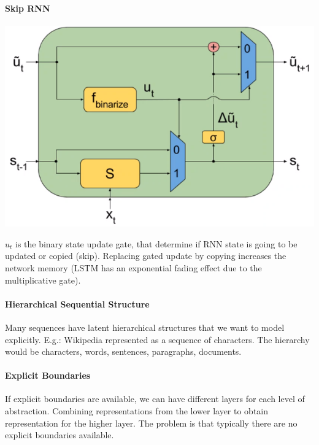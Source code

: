 \documentclass[10pt]{report}
\begin{document}
\paragraph{Skip RNN}
\begin{center}
	\includegraphics[scale=0.5]{125.png}
\end{center}
$u_t$ is the binary state update gate, that determine if RNN state is going to be updated or copied (skip). Replacing gated update by copying increases the network memory (LSTM has an exponential fading effect due to the multiplicative gate).
\paragraph{Hierarchical Sequential Structure}
Many sequences have latent hierarchical structures that we want to model explicitly. E.g.: Wikipedia represented as a sequence of characters. The hierarchy would be characters, words, sentences, paragraphs, documents.
\paragraph{Explicit Boundaries} If explicit boundaries are available, we can have different layers for each level of abstraction. Combining representations from the lower layer to obtain representation for the higher layer. The problem is that typically there are no explicit boundaries available.
\end{document}

